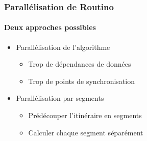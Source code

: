 
\begin{frame}
  \frametitle{Parallélisation de Routino}
  \framesubtitle{Deux approches possibles}
  \begin{itemize}
  \item Parallélisation de l'algorithme
    \begin{itemize}
    \item Trop de dépendances de données
    \item Trop de points de synchronisation
    \end{itemize}
    \vspace{1em}
  \item Parallélisation par segments
    \begin{itemize}
    \item Prédécouper l'itinéraire en segments
    \item Calculer chaque segment séparément
    \end{itemize}
  \end{itemize}
\end{frame}


